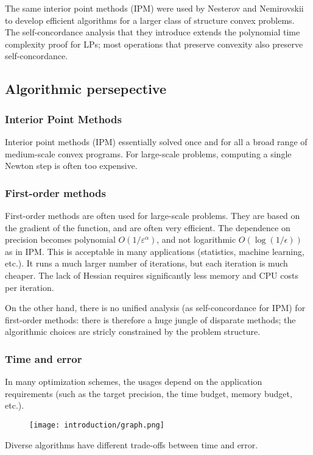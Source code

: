 The same interior point methods (IPM) were used by Nesterov and Nemirovskii to develop efficient algorithms for a larger class of structure convex problems. The self-concordance analysis that they introduce extends the polynomial time complexity proof for LPs; most operations that preserve convexity also preserve self-concordance.

\subsection{Algorithmic persepective}
\subsubsection{Interior Point Methods}
Interior point methods (IPM) essentially solved once and for all a broad range of medium-scale convex programs. For large-scale problems, computing a single Newton step is often too expensive.

\subsubsection{First-order methods}
First-order methods are often used for large-scale problems. They are based on the gradient of the function, and are often very efficient. The dependence on precision becomes polynomial $O(1/\varepsilon^\alpha)$, and not logarithmic $O(\log(1/\epsilon))$ as in IPM. This is acceptable in many applications (statistics, machine learning, etc.). It runs a much larger number of iterations, but each iteration is much cheaper. The lack of Hessian requires significantly less memory and CPU costs per iteration.

On the other hand, there is no unified analysis (as self-concordance for IPM) for first-order methods: there is therefore a huge jungle of disparate methods; the algorithmic choices are stricly constrained by the problem structure.

\subsubsection{Time and error}
In many optimization schemes, the usages depend on the application requirements (such as the target precision, the time budget, memory budget, etc.).
\begin{figure}[H]
    \centering
    \texttt{[image: introduction/graph.png]}
\end{figure}
Diverse algorithms have different trade-offs between time and error.

